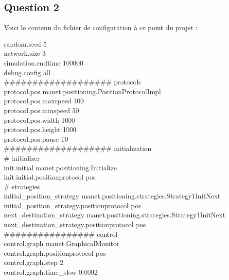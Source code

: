 \documentclass[10pt]{report}
\begin{document}
\subsection{Question 2}
Voici le contenu du fichier de configuration à ce point du projet :
\newline
\newline
\noindent\begin{minipage}{\textwidth}
\begin{framed}
\begin{shaded}
random.seed 5\\
network.size 3\\
simulation.endtime 100000\\
debug.config all\\
\#\#\#\#\#\#\#\#\#\#\#\#\#\#\#\#\#\#\# protocols\\
protocol.pos manet.positioning.PositionProtocolImpl\\
protocol.pos.maxspeed 100\\
protocol.pos.minspeed 50\\
protocol.pos.width 1000\\
protocol.pos.height 1000\\
protocol.pos.pause 10\\
\#\#\#\#\#\#\#\#\#\#\#\#\#\#\#\#\#\#\# initialization\\
\# initializer\\
init.initial manet.positioning.Initialize\\
init.initial.positionprotocol pos\\
\# strategies\\
initial\_position\_strategy manet.positioning.strategies.Strategy1InitNext\\
initial\_position\_strategy.positionprotocol pos\\
next\_destination\_strategy manet.positioning.strategies.Strategy1InitNext\\
next\_destination\_strategy.positionprotocol pos\\
\#\#\#\#\#\#\#\#\#\#\#\#\#\#\#\# control\\
control.graph manet.GraphicalMonitor\\
control.graph.positionprotocol pos\\
control.graph.step 2\\
control.graph.time\_slow 0.0002
\end{shaded}
\end{framed}
\end{minipage}
\end{document}
